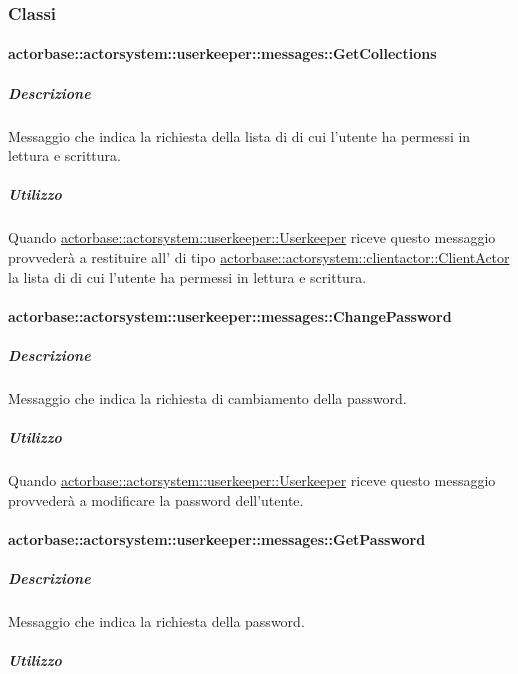 \documentclass{scalatekids-article}
\begin{document}
\subsubsection{Classi}

\paragraph{actorbase::actorsystem::userkeeper::messages::GetCollections}
\label{sec:actorbase::actorsystem::userkeeper::messages::GetCollections}

\subparagraph{Descrizione}
Messaggio che indica la richiesta della lista di  di cui
l'utente ha permessi in lettura e scrittura.

\subparagraph{Utilizzo}
Quando \hyperref[sec:actorbase::actorsystem::userkeeper::Userkeeper]{actorbase::\allowbreak{}actorsystem::\allowbreak{}userkeeper::\allowbreak{}Userkeeper}
riceve questo messaggio provvederà a restituire all' di tipo
\hyperref[sec:actorbase::actorsystem::clientactor::ClientActor]{actorbase::\allowbreak{}actorsystem::\allowbreak{}clientactor::\allowbreak{}ClientActor}
la lista di  di cui l'utente ha permessi in lettura
e scrittura.

\paragraph{actorbase::actorsystem::userkeeper::messages::ChangePassword}
\label{sec:actorbase::actorsystem::userkeeper::messages::ChangePassword}

\subparagraph{Descrizione}
Messaggio che indica la richiesta di cambiamento della password.

\subparagraph{Utilizzo}
Quando \hyperref[sec:actorbase::actorsystem::userkeeper::Userkeeper]{actorbase::\allowbreak{}actorsystem::\allowbreak{}userkeeper::\allowbreak{}Userkeeper}
riceve questo messaggio provvederà a modificare la password dell'utente.


\paragraph{actorbase::actorsystem::userkeeper::messages::GetPassword}
\label{sec:actorbase::actorsystem::userkeeper::messages::GetPassword}

\subparagraph{Descrizione}

Messaggio che indica la richiesta della password.

\subparagraph{Utilizzo}
\end{document}
